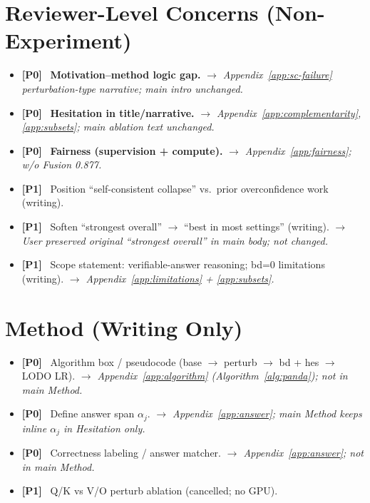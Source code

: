\documentclass[11pt]{article}
\newcommand{\todo}{\item[$\square$]}
\newcommand{\done}{\item[\textcolor{donecolor}{$\boxtimes$}]}
\newcommand{\skipdone}{\item[\textcolor{skipcolor}{$\boxminus$}]}
\newcommand{\tagp}[2]{\textbf{\textcolor{#1}{[#2]}}\ }
\newcommand{\fixnote}[1]{\newline\textcolor{p2}{\itshape $\rightarrow$ #1}}
\begin{document}
\section{Reviewer-Level Concerns (Non-Experiment)}
\begin{itemize}
  \done \tagp{p0}{P0} \textbf{Motivation--method logic gap.}
        \fixnote{Appendix~\ref{app:sc-failure} perturbation-type narrative; main intro unchanged.}

  \done \tagp{p0}{P0} \textbf{Hesitation in title/narrative.}
        \fixnote{Appendix~\ref{app:complementarity}, \ref{app:subsets}; main ablation text unchanged.}

  \done \tagp{p0}{P0} \textbf{Fairness (supervision + compute).}
        \fixnote{Appendix~\ref{app:fairness}; w/o Fusion 0.877.}

  \todo \tagp{p1}{P1} Position ``self-consistent collapse'' vs.\ prior overconfidence work (writing).

  \skipdone \tagp{p1}{P1} Soften ``strongest overall'' $\rightarrow$ ``best in most settings'' (writing).
        \fixnote{User preserved original ``strongest overall'' in main body; not changed.}

  \done \tagp{p1}{P1} Scope statement: verifiable-answer reasoning; bd=0 limitations (writing).
        \fixnote{Appendix~\ref{app:limitations} + \ref{app:subsets}.}
\end{itemize}

\section{Method (Writing Only)}
\begin{itemize}
  \done \tagp{p0}{P0} Algorithm box / pseudocode (base $\rightarrow$ perturb $\rightarrow$ bd + hes $\rightarrow$ LODO LR).
        \fixnote{Appendix~\ref{app:algorithm} (Algorithm~\ref{alg:panda}); not in main Method.}

  \done \tagp{p0}{P0} Define answer span $\alpha_j$.
        \fixnote{Appendix~\ref{app:answer}; main Method keeps inline $\alpha_j$ in Hesitation only.}

  \done \tagp{p0}{P0} Correctness labeling / answer matcher.
        \fixnote{Appendix~\ref{app:answer}; not in main Method.}

  \skipdone \tagp{p1}{P1} Q/K vs V/O perturb ablation (cancelled; no GPU).
\end{itemize}
\end{document}
